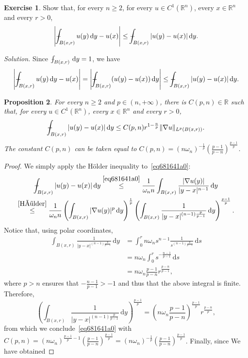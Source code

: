 \documentclass[a4paper,9pt]{amsart}
\newcommand{\R}{\mathbb{R}}	%
\newcommand{\did}{\,\mathrm{d}}	%
\newcommand{\grad}{\nabla}
\def\Xint#1{\mathchoice
      {\XXint\displaystyle\textstyle{#1}}%
      {\XXint\textstyle\scriptstyle{#1}}%
      {\XXint\scriptstyle\scriptscriptstyle{#1}}%
      {\XXint\scriptscriptstyle\scriptscriptstyle{#1}}%
      \!\int}
\def\XXint#1#2#3{{\setbox0=\hbox{$#1{#2#3}{\int}$}
        \vcenter{\hbox{$#2#3$}}\kern-.5\wd0}}
\def\fint{\Xint-}
\theoremstyle{plain}
\newtheorem{proposition}{Proposition}[section]
\theoremstyle{definition}
\newtheorem{exercise}[proposition]{Exercise}%
\theoremstyle{remark}
\begin{document}
\begin{exercise}
	Show that,
	for every $n\ge2$, for every $u\in C^1(\R^n)$, every $x\in\R^n$ and every $r>0$,
	\begin{equation}\label{eq68356a65}
		\left| \fint_{B(x,r)} u(y) \did y -u(x) \right|
		\le \fint_{B(x,r)} |u(y)-u(x)| \did y .
	\end{equation}
	
	{\it Solution.}
	Since $\fint_{B(x,r)}\did y =1$, we have
	\begin{equation}
		\left| \fint_{B(x,r)} u(y) \did y -u(x) \right|
		= \left| \fint_{B(x,r)} (u(y)  -u(x)) \did y \right|
		\le \fint_{B(x,r)} |u(y)-u(x)| \did y .
	\end{equation}
\end{exercise}

\begin{proposition}\label{prop683569eb}
	For every $n\ge2$ and $p\in(n,+\infty)$, there is $C(p,n)\in\R$ such that, for every $u\in C^1(\R^n)$, every $x\in\R^n$ and every $r>0$, 
	\begin{equation}\label{eq6816524f} 
		\fint_{B(x,r)} |u(y)-u(x)| \did y 
		\le C(p,n) r^{1-\frac{n}{p}} \|\grad u\|_{L^p(B(x,r))} .
	\end{equation}
	The constant $C(p,n)$ can be taken equal to $C(p,n)=(n\omega_n)^{-\frac1p} \left(\frac{p-1}{p-n}\right)^{\frac{p-1}{p}}$.
\end{proposition}
\begin{proof}
	We simply apply the Hölder inequality to~\eqref{eq681641a0}:
	\begin{multline}
		\fint_{B(x,r)} |u(y)-u(x)| \did y 
		\overset{\eqref{eq681641a0}}\le \frac{1}{\omega_n n} \int_{B(x,r)} \frac{ |\grad u(y)| }{ |y-x|^{n-1} } \did y \\
		\overset{\eqref{Hölder}}\le \frac{1}{\omega_n n} 
			\left( \int_{B(x,r)} |\grad u(y)|^p \did y \right)^{\frac1p}
			\left( \int_{B(x,r)} \frac{1}{ |y-x|^{(n-1)\frac{p}{p-1}} } \did y  \right)^{\frac{p-1}{p}} .
	\end{multline}
	Notice that, using polar coordinates,
	\begin{align}
		\int_{B(x,r)} \frac{1}{ |y-x|^{(n-1)\frac{p}{p-1}} } \did y
		&= \int_0^r n\omega_n s^{n-1} \frac{1}{s^{(n-1)\frac{p}{p-1}} } \did s \\
		&= n\omega_n  \int_0^r s^{-\frac{n-1}{p-1}} \did s \\
		&= n\omega_n \frac{p-1}{p-n} r^{\frac{p-n}{p-1}} ,
	\end{align}
	where $p>n$ ensures that $-\frac{n-1}{p-1}>-1$ and thus that the above integral is finite.
	Therefore,
	\begin{equation}
		\left( \int_{B(x,r)} \frac{1}{ |y-x|^{(n-1)\frac{p}{p-1}} } \did y  \right)^{\frac{p-1}{p}}
		= \left(n\omega_n\frac{p-1}{p-n}\right)^{\frac{p-1}{p}} r^{\frac{p-n}{p}} ,
	\end{equation}
	from which we conclude~\eqref{eq681641a0} with $C(p,n) = (n\omega_n)^{\frac{p-1}{p}-1} \left(\frac{p-1}{p-n}\right)^{\frac{p-1}{p}} = (n\omega_n)^{-\frac1p} \left(\frac{p-1}{p-n}\right)^{\frac{p-1}{p}}$.
	Finally, since We have obtained
\end{proof}
\end{document}

